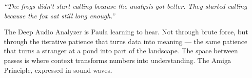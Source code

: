 \documentclass[11pt,letterpaper]{article}
\begin{document}
\vspace{1em}

\begin{quotebox}
\textit{``The frogs didn't start calling because the analysis got better. They started calling because the fox sat still long enough.''}

\vspace{0.5em}

The Deep Audio Analyzer is Paula learning to hear. Not through brute force, but through the iterative patience that turns data into meaning --- the same patience that turns a stranger at a pond into part of the landscape. The space between passes is where context transforms numbers into understanding. The Amiga Principle, expressed in sound waves.
\end{quotebox}
\end{document}
